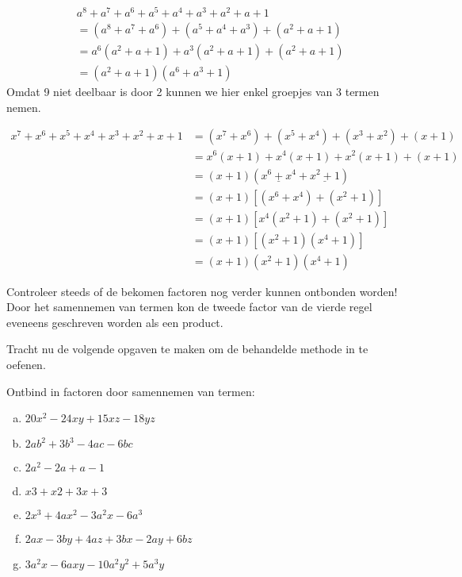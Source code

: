 \documentclass[12pt]{article}
\begin{document}
\begin{voorbeeld}
\begin{align*}
  & a^8 + a^7 + a^6 + a^5 + a^4 + a^3 + a^2 + a + 1\\
  &= (a^8 + a^7 +a^6) + (a^5 + a^4 + a^3) + (a^2 + a + 1)\\
  &= a^6 (a^2 + a + 1) + a^3 (a^2 + a + 1) + (a^2 + a + 1)\\
  &= (a^2 + a + 1) (a^6 + a^3 + 1)
\end{align*}
Omdat 9 niet deelbaar is door 2 kunnen we hier enkel groepjes van 3 termen nemen.
\end{voorbeeld}

\begin{voorbeeld}
\begin{align*}
x^7 + x^6 + x^5 + x^4 + x^3 + x^2 + x + 1
&= (x^7 + x^6) + (x^5 + x^4) + (x^3 + x^2) + (x + 1)\\
&= x^6 (x + 1) + x^4 (x + 1) + x^2 (x + 1) + (x + 1)\\
&= (x + 1) (\underline{x^6 + x^4} + \underline{x^2 + 1})\\
&= (x + 1) [(x^6 + x^4) + (x^2 + 1)]\\
&= (x + 1) [x^4(x^2 + 1) + (x^2 + 1)]\\
&= (x + 1) [(x^2 + 1) (x^4 + 1)]\\
&= (x + 1) (x^2 + 1) (x^4 + 1)
\end{align*}

Controleer steeds of de bekomen factoren nog verder kunnen ontbonden worden!
Door het samennemen van termen kon de tweede factor van de vierde regel eveneens geschreven worden als een product.
\end{voorbeeld}

Tracht nu de volgende opgaven te maken om de behandelde methode in te oefenen.

\begin{exercise}
Ontbind in factoren door samennemen van termen:
\begin{enumerate}[(a)]
  \item $20x^2 - 24xy + 15xz - 18yz$
  \item $2ab^2 + 3b^3 - 4ac - 6bc$
  \item $2a^2 - 2a + a - 1$
  \item $x3 + x2 + 3x + 3$
  \item $2x^3 + 4ax^2 - 3a^2x - 6a^3$
  \item $2ax - 3by + 4az + 3bx - 2ay + 6bz$
  \item $3a^2x - 6axy - 10a^2y^2 + 5a^3y$
\end{enumerate}
\end{exercise}
\end{document}
